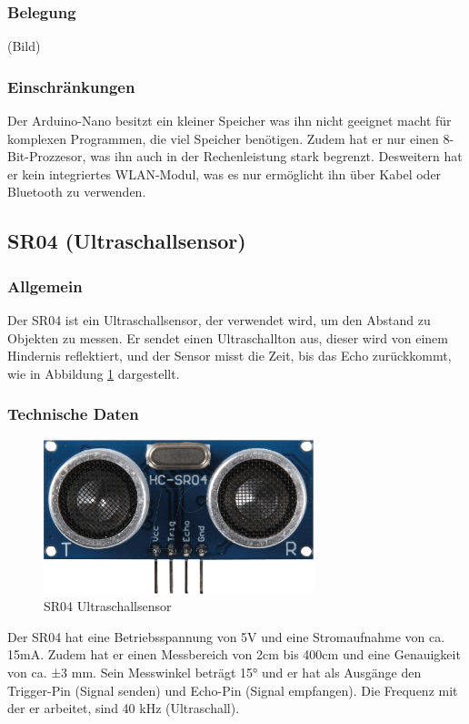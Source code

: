 \subsubsection{Belegung}
(Bild)
\subsubsection{Einschränkungen}
Der Arduino-Nano besitzt ein kleiner Speicher was ihn  nicht geeignet macht für komplexen Programmen, die viel Speicher benötigen. 
Zudem hat er nur einen 8-Bit-Prozzesor, was ihn auch in der Rechenleistung stark begrenzt. Desweitern hat er kein integriertes WLAN-Modul, 
was es nur ermöglicht ihn  über Kabel oder Bluetooth zu verwenden.
%
\subsection{SR04 (Ultraschallsensor)}
%
\subsubsection{Allgemein}
Der SR04 ist ein Ultraschallsensor, der verwendet wird, um den Abstand zu Objekten zu messen. Er sendet einen Ultraschallton aus, dieser wird von einem Hindernis reflektiert, und der Sensor misst die Zeit, bis das Echo zurückkommt, wie in Abbildung \ref{fig:sr04} dargestellt.
\subsubsection{Technische Daten}
\begin{figure}[H]
    \centering
    \includegraphics[width=0.7\textwidth]{img/Hardware/sr04.png}
    \caption{SR04 Ultraschallsensor}
    \label{fig:sr04}
\end{figure}
Der SR04 hat eine Betriebsspannung von 5V und eine Stromaufnahme von ca. 15mA. 
Zudem hat er einen Messbereich von 2cm bis 400cm und eine Genauigkeit von ca. ±3 mm. 
Sein Messwinkel beträgt 15° und er hat als Ausgänge den Trigger-Pin (Signal senden) und Echo-Pin (Signal empfangen). 
Die Frequenz mit der er arbeitet, sind 40 kHz (Ultraschall).
